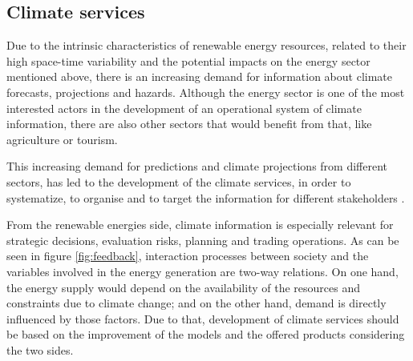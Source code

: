 

\subsection{Climate services}


Due to the intrinsic characteristics of renewable energy resources, related to their high space-time variability and the potential impacts on the energy sector mentioned above, there is an increasing demand for information about climate forecasts, projections and hazards. Although the energy sector is one of the most interested actors in the development of an operational system of climate information, there are also other sectors that would benefit from that, like agriculture or tourism.  
  
This increasing demand for predictions and climate projections from different sectors, has led to the development of the  climate services, in order to systematize, to organise and to target the information for different stakeholders \cite*{Troccoli2018}.


From the renewable energies side, climate information is especially relevant for strategic decisions, evaluation risks, planning and trading operations. As can be seen in figure \ref{fig:feedback}, interaction processes between society and the variables involved in the energy generation are two-way relations. On one hand, the energy supply would depend on the availability of the resources and constraints due to climate change;  and on the other hand, demand is directly influenced by those factors. Due to that, development of climate services should be based on the improvement of the models and the offered products considering the two sides.   

